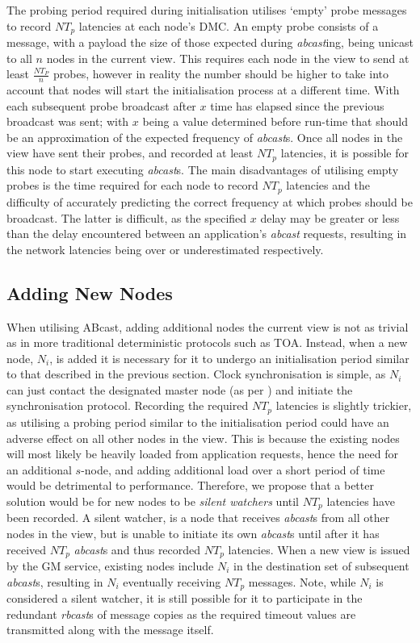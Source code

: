     The probing period required during initialisation utilises \textquoteleft{}empty' probe messages to record $NT_p$ latencies at each node's DMC.  An empty probe consists of a message, with a payload the size of those expected during \emph{abcast}ing, being unicast to all $n$ nodes in the current view.  This requires each node in the view to send at least $\frac{NT_P}{n}$ probes, however in reality the number should be higher to take into account that nodes will start the initialisation process at a different time.  With each subsequent probe broadcast after $x$ time has elapsed since the previous broadcast was sent; with $x$ being a value determined before run-time that should be an approximation of the expected frequency of \emph{abcast}s.  Once all nodes in the view have sent their probes, and recorded at least $NT_p$ latencies, it is possible for this node to start executing \emph{abcast}s.  The main disadvantages of utilising empty probes is the time required for each node to record $NT_p$ latencies and the difficulty of accurately predicting the correct frequency at which probes should be broadcast.  The latter is difficult, as the specified $x$ delay may be greater or less than the delay encountered between an application's \emph{abcast} requests, resulting in the network latencies being over or underestimated respectively.  
    
    \subsection{Adding New Nodes}
    When utilising \textsf{ABcast}, adding additional nodes the current view is not as trivial as in more traditional deterministic protocols such as TOA.  Instead, when a new node, $N_i$, is added it is necessary for it to undergo an initialisation period similar to that described in the previous section.  Clock synchronisation is simple, as $N_i$ can just contact the designated master node (as per \citep{Cristian:1996:SA:227210.227231}) and initiate the synchronisation protocol.  Recording the required $NT_p$ latencies is slightly trickier, as utilising a probing period similar to the initialisation period could have an adverse effect on all other nodes in the view.  This is because the existing nodes will most likely be heavily loaded from application requests, hence the need for an additional $s$-node, and adding additional load over a short period of time would be detrimental to performance.  Therefore, we propose that a better solution would be for new nodes to be \emph{silent watchers} until $NT_p$ latencies have been recorded.  A silent watcher, is a node that receives \emph{abcast}s from all other nodes in the view, but is unable to initiate its own \emph{abcast}s until after it has received $NT_p$ \emph{abcast}s and thus recorded $NT_p$ latencies.  When a new view is issued by the GM service, existing nodes include $N_i$ in the destination set of subsequent \emph{abcast}s, resulting in $N_i$ eventually receiving $NT_p$ messages.  Note, while $N_i$ is considered a silent watcher, it is still possible for it to participate in the redundant \emph{rbcast}s of message copies as the required timeout values are transmitted along with the message itself.      
    
